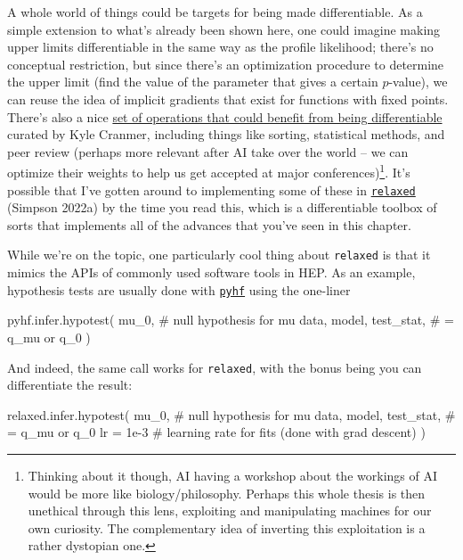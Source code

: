 \documentclass[
  11pt,
  numbers=noendperiod]{book}
\newenvironment{Shaded}{\begin{snugshade}}{\end{snugshade}}
\newcommand{\CommentTok}[1]{\scriptsize\textcolor[rgb]{0.37,0.37,0.37}{#1}}
\newcommand{\FloatTok}[1]{\scriptsize\textcolor[rgb]{0.68,0.00,0.00}{#1}}
\newcommand{\NormalTok}[1]{\scriptsize\textcolor[rgb]{0.00,0.23,0.31}{#1}}
\newcommand{\OperatorTok}[1]{\scriptsize\textcolor[rgb]{0.37,0.37,0.37}{#1}}
\begin{document}
A whole world of things could be targets for being made differentiable.
As a simple extension to what's already been shown here, one could
imagine making upper limits differentiable in the same way as the
profile likelihood; there's no conceptual restriction, but since there's
an optimization procedure to determine the upper limit (find the value
of the parameter that gives a certain \(p\)-value), we can reuse the
idea of implicit gradients that exist for functions with fixed points.
There's also a nice
\href{http://github.com/gradhep/relaxed/list_of_operations.md}{set of
operations that could benefit from being differentiable} curated by Kyle
Cranmer, including things like sorting, statistical methods, and peer
review (perhaps more relevant after AI take over the world -- we can
optimize their weights to help us get accepted at major
conferences)\footnote{Thinking about it though, AI having a workshop
  about the workings of AI would be more like biology/philosophy.
  Perhaps this whole thesis is then unethical through this lens,
  exploiting and manipulating machines for our own curiosity. The
  complementary idea of inverting this exploitation is a rather
  dystopian one.}. It's possible that I've gotten around to implementing
some of these in
\href{http://github.com/gradhep/relaxed}{\texttt{relaxed}} (Simpson
2022a) by the time you read this, which is a differentiable toolbox of
sorts that implements all of the advances that you've seen in this
chapter.

While we're on the topic, one particularly cool thing about
\texttt{relaxed} is that it mimics the APIs of commonly used software
tools in HEP. As an example, hypothesis tests are usually done with
\href{http://github.com/scikit-hep/pyhf}{\texttt{pyhf}} using the
one-liner

\begin{Shaded}
\begin{Highlighting}[]
\NormalTok{pyhf.infer.hypotest(}
\NormalTok{    mu\_0,  }\CommentTok{\# null hypothesis for mu}
\NormalTok{    data,}
\NormalTok{    model,}
\NormalTok{    test\_stat,  }\CommentTok{\# = q\_mu or q\_0}
\NormalTok{)}
\end{Highlighting}
\end{Shaded}

And indeed, the same call works for \texttt{relaxed}, with the bonus
being you can differentiate the result:

\begin{Shaded}
\begin{Highlighting}[]
\NormalTok{relaxed.infer.hypotest(}
\NormalTok{    mu\_0,  }\CommentTok{\# null hypothesis for mu}
\NormalTok{    data,}
\NormalTok{    model,}
\NormalTok{    test\_stat,  }\CommentTok{\# = q\_mu or q\_0}
\NormalTok{    lr }\OperatorTok{=} \FloatTok{1e{-}3}  \CommentTok{\# learning rate for fits (done with grad descent)}
\NormalTok{)}
\end{Highlighting}
\end{Shaded}
\end{document}
